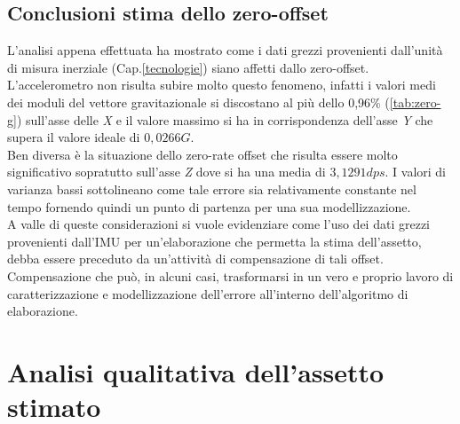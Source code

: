 \subsection{Conclusioni stima dello zero-offset}
L'analisi appena effettuata ha mostrato come i dati grezzi provenienti dall'unità di misura inerziale (Cap.\ref{tecnologie}) siano affetti dallo zero-offset.\\
L'accelerometro non risulta subire molto questo fenomeno, infatti i valori medi dei moduli del vettore gravitazionale si discostano al più dello 0,96\% (\ref{tab:zero-g}) sull'asse delle \textit{X} e il valore massimo si ha in corrispondenza dell'asse \textit{Y} che supera il valore ideale di $0,0266 G$. \\
Ben diversa è la situazione dello zero-rate offset che risulta essere molto significativo sopratutto sull'asse \textit{Z} dove si ha una media di $3,1291 dps$. I valori di varianza bassi sottolineano come tale errore sia relativamente constante nel tempo fornendo quindi un punto di partenza per una sua modellizzazione.\\
A valle di queste considerazioni si vuole evidenziare come l'uso dei dati grezzi provenienti dall'IMU per un'elaborazione che permetta la stima dell'assetto, debba essere preceduto da un'attività di compensazione di tali offset. Compensazione che può, in alcuni casi, trasformarsi in un vero e proprio lavoro di caratterizzazione e modellizzazione dell'errore all'interno dell'algoritmo di elaborazione. 





\section{Analisi qualitativa dell'assetto stimato}
\label{analisiQualitativa}


